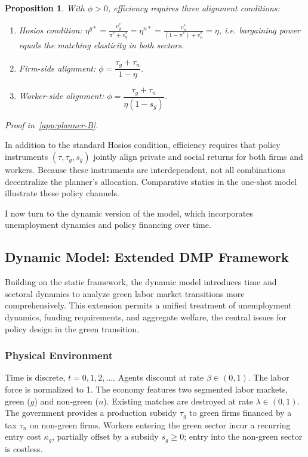 \documentclass[preprint,12pt]{elsarticle}
\newtheorem{proposition}{Proposition}
\begin{document}
\begin{proposition}\label{prop:full-efficiency}
With $\phi>0$, efficiency requires three alignment conditions:  
\begin{enumerate}
    \item Hosios condition: $\eta^{g*}=\frac{v_g^*}{\pi^*+v_g^*}=\eta^{n*}=\frac{v_n^*}{(1-\pi^*)+v_n^*}=\eta$, i.e. bargaining power equals the matching elasticity in both sectors.  
    \item Firm-side alignment: $\phi = \dfrac{\tau_g+\tau_n}{1-\eta}$.  
    \item Worker-side alignment: $\phi = \dfrac{\tau_g+\tau_n}{\eta(1-s_g)}$.  
\end{enumerate}
\end{proposition}

\textit{Proof in~\ref{app:planner-B}}.  

\noindent In addition to the standard Hosios condition, efficiency requires that policy instruments $(\tau,\tau_g,s_g)$ jointly align private and social returns for both firms and workers. Because these instruments are interdependent, not all combinations decentralize the planner’s allocation. Comparative statics in the one-shot model illustrate these policy channels.

\medskip

\noindent I now turn to the dynamic version of the model, which incorporates unemployment dynamics and policy financing over time.

\subsection{Dynamic Model: Extended DMP Framework}
\label{sec:dynamic-model}

Building on the static framework, the dynamic model introduces time and sectoral dynamics to analyze green labor market transitions more comprehensively. This extension permits a unified treatment of unemployment dynamics, funding requirements, and aggregate welfare, the central issues for policy design in the green transition.

\subsubsection{Physical Environment}
Time is discrete, $t=0,1,2,\dots$. Agents discount at rate $\beta\in(0,1)$. The labor force is normalized to 1. The economy features two segmented labor markets, green ($g$) and non-green ($n$). Existing matches are destroyed at rate $\lambda\in(0,1)$. The government provides a production subsidy $\tau_g$ to green firms financed by a tax $\tau_n$ on non-green firms. Workers entering the green sector incur a recurring entry cost $\kappa_g$, partially offset by a subsidy $s_g \geq 0$; entry into the non-green sector is costless.
\end{document}

